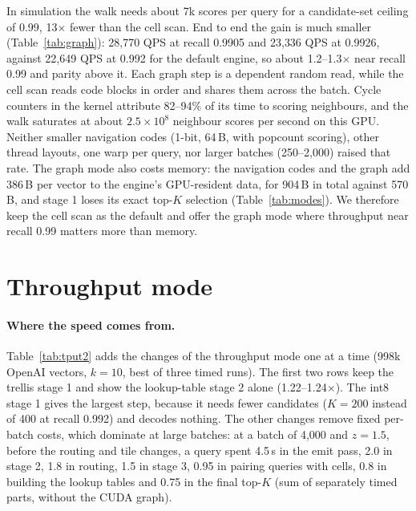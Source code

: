 \documentclass[10pt]{article}
\begin{document}
In simulation the walk needs about 7k scores per query for a candidate-set ceiling of 0.99, 13$\times$ fewer than the cell scan. End to end the gain is much smaller (Table~\ref{tab:graph}): 28{,}770 QPS at recall 0.9905 and 23{,}336 QPS at 0.9926, against 22{,}649 QPS at 0.992 for the default engine, so about 1.2--1.3$\times$ near recall 0.99 and parity above it. Each graph step is a dependent random read, while the cell scan reads code blocks in order and shares them across the batch. Cycle counters in the kernel attribute 82--94\% of its time to scoring neighbours, and the walk saturates at about $2.5\times10^8$ neighbour scores per second on this GPU. Neither smaller navigation codes (1-bit, 64\,B, with popcount scoring), other thread layouts, one warp per query, nor larger batches (250--2{,}000) raised that rate. The graph mode also costs memory: the navigation codes and the graph add 386\,B per vector to the engine's GPU-resident data, for 904\,B in total against 570\,B, and stage 1 loses its exact top-$K$ selection (Table~\ref{tab:modes}). We therefore keep the cell scan as the default and offer the graph mode where throughput near recall 0.99 matters more than memory.

\section{Throughput mode}\label{sn:tput}
\paragraph{Where the speed comes from.} Table~\ref{tab:tput2} adds the changes of the throughput mode one at a time (998k OpenAI vectors, $k=10$, best of three timed runs). The first two rows keep the trellis stage 1 and show the lookup-table stage 2 alone (1.22--1.24$\times$). The int8 stage 1 gives the largest step, because it needs fewer candidates ($K=200$ instead of 400 at recall 0.992) and decodes nothing. The other changes remove fixed per-batch costs, which dominate at large batches: at a batch of 4{,}000 and $z=1.5$, before the routing and tile changes, a query spent 4.5\,\textmu s in the emit pass, 2.0 in stage 2, 1.8 in routing, 1.5 in stage 3, 0.95 in pairing queries with cells, 0.8 in building the lookup tables and 0.75 in the final top-$K$ (sum of separately timed parts, without the CUDA graph).
\end{document}
